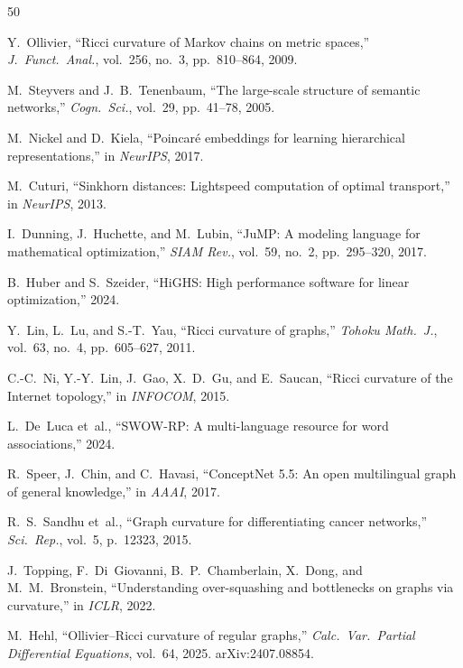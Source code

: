 \documentclass[11pt,a4paper]{article}
\begin{document}

\begin{thebibliography}{50}

Y.~Ollivier, ``Ricci curvature of Markov chains on metric spaces,'' \emph{J.~Funct.~Anal.}, vol.~256, no.~3, pp.~810--864, 2009.

M.~Steyvers and J.~B.~Tenenbaum, ``The large-scale structure of semantic networks,'' \emph{Cogn.~Sci.}, vol.~29, pp.~41--78, 2005.

M.~Nickel and D.~Kiela, ``Poincar\'e embeddings for learning hierarchical representations,'' in \emph{NeurIPS}, 2017.

M.~Cuturi, ``Sinkhorn distances: Lightspeed computation of optimal transport,'' in \emph{NeurIPS}, 2013.

I.~Dunning, J.~Huchette, and M.~Lubin, ``JuMP: A modeling language for mathematical optimization,'' \emph{SIAM Rev.}, vol.~59, no.~2, pp.~295--320, 2017.

B.~Huber and S.~Szeider, ``HiGHS: High performance software for linear optimization,'' 2024.

Y.~Lin, L.~Lu, and S.-T.~Yau, ``Ricci curvature of graphs,'' \emph{Tohoku Math.~J.}, vol.~63, no.~4, pp.~605--627, 2011.

C.-C.~Ni, Y.-Y.~Lin, J.~Gao, X.~D.~Gu, and E.~Saucan, ``Ricci curvature of the Internet topology,'' in \emph{INFOCOM}, 2015.

L.~De~Luca et~al., ``SWOW-RP: A multi-language resource for word associations,'' 2024.

R.~Speer, J.~Chin, and C.~Havasi, ``ConceptNet 5.5: An open multilingual graph of general knowledge,'' in \emph{AAAI}, 2017.

R.~S.~Sandhu et~al., ``Graph curvature for differentiating cancer networks,'' \emph{Sci.~Rep.}, vol.~5, p.~12323, 2015.

J.~Topping, F.~Di~Giovanni, B.~P.~Chamberlain, X.~Dong, and M.~M.~Bronstein, ``Understanding over-squashing and bottlenecks on graphs via curvature,'' in \emph{ICLR}, 2022.

M.~Hehl, ``Ollivier--Ricci curvature of regular graphs,'' \emph{Calc.~Var.~Partial Differential Equations}, vol.~64, 2025. arXiv:2407.08854.


\end{thebibliography}
\end{document}

